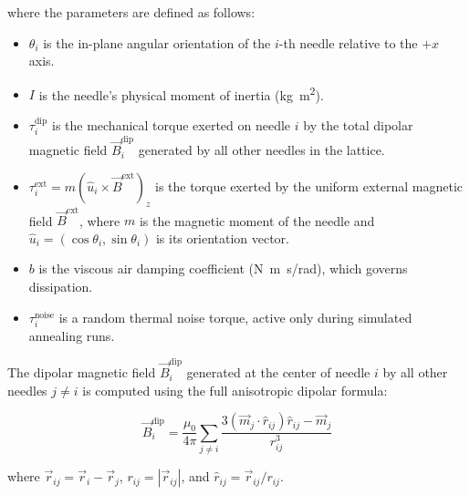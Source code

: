 \documentclass[11pt,a4paper]{article}
\begin{document}
\noindent
where the parameters are defined as follows:
\begin{itemize}
    \item $\theta_i$ is the in-plane angular orientation of the $i$-th needle relative to the $+x$ axis.
    \item $I$ is the needle's physical moment of inertia (\si{kg.m^2}).
    \item $\tau_i^{\text{dip}}$ is the mechanical torque exerted on needle $i$ by the total dipolar magnetic field $\vec{B}_i^{\text{dip}}$ generated by all other needles in the lattice.
    \item $\tau_i^{\text{ext}} = m (\hat{u}_i \times \vec{B}^{\text{ext}})_z$ is the torque exerted by the uniform external magnetic field $\vec{B}^{\text{ext}}$, where $m$ is the magnetic moment of the needle and $\hat{u}_i = (\cos\theta_i, \sin\theta_i)$ is its orientation vector.
    \item $b$ is the viscous air damping coefficient (\si{N.m.s/rad}), which governs dissipation.
    \item $\tau_i^{\text{noise}}$ is a random thermal noise torque, active only during simulated annealing runs.
\end{itemize}

The dipolar magnetic field $\vec{B}_i^{\text{dip}}$ generated at the center of needle $i$ by all other needles $j \neq i$ is computed using the full anisotropic dipolar formula:

\begin{equation}
\vec{B}_i^{\text{dip}} = \frac{\mu_0}{4\pi} \sum_{j \neq i} \frac{3(\vec{m}_j \cdot \hat{r}_{ij})\hat{r}_{ij} - \vec{m}_j}{r_{ij}^3}
\end{equation}

\noindent
where $\vec{r}_{ij} = \vec{r}_i - \vec{r}_j$, $r_{ij} = |\vec{r}_{ij}|$, and $\hat{r}_{ij} = \vec{r}_{ij}/r_{ij}$.
\end{document}
